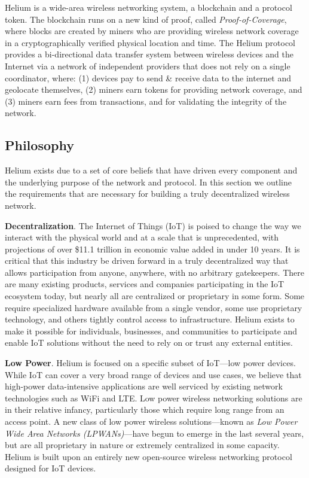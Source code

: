 \documentclass[letterpaper,11pt]{article}
\begin{document}
Helium is a wide-area wireless networking system, a blockchain and a protocol token. The blockchain runs on a new kind of proof, called \emph{Proof-of-Coverage}, where blocks are created by miners who are providing wireless network coverage in a cryptographically verified physical location and time. The Helium protocol provides a bi-directional data transfer system between wireless devices and the Internet via a network of independent providers that does not rely on a single coordinator, where: (1) devices pay to send \& receive data to the internet and geolocate themselves, (2) miners earn tokens for providing network coverage, and (3) miners earn fees from transactions, and for validating the integrity of the network.

\subsection{Philosophy}

Helium exists due to a set of core beliefs that have driven every component and the underlying purpose of the network and protocol. In this section we outline the requirements that are necessary for building a truly decentralized wireless network.

\textbf{Decentralization}. The Internet of Things (IoT) is poised to change the way we interact with the physical world and at a scale that is unprecedented, with projections of over \$11.1 trillion in economic value added in under 10 years\cite{mckinsey}. It is critical that this industry be driven forward in a truly decentralized way that allows participation from anyone, anywhere, with no arbitrary gatekeepers. There are many existing products, services and companies participating in the IoT ecosystem today, but nearly all are centralized or proprietary in some form. Some require specialized hardware available from a single vendor, some use proprietary technology, and others tightly control access to infrastructure. Helium exists to make it possible for individuals, businesses, and communities to participate and enable IoT solutions without the need to rely on or trust any external entities.

\textbf{Low Power}. Helium is focused on a specific subset of IoT---low power devices. While IoT can cover a very broad range of devices and use cases, we believe that high-power data-intensive applications are well serviced by existing network technologies such as WiFi and LTE\@. Low power wireless networking solutions are in their relative infancy, particularly those which require long range from an access point. A new class of low power wireless solutions---known as \emph{Low Power Wide Area Networks (LPWANs)}---have begun to emerge in the last several years, but are all proprietary in nature or extremely centralized in some capacity. Helium is built upon an entirely new open-source wireless networking protocol designed for IoT devices.
\end{document}

